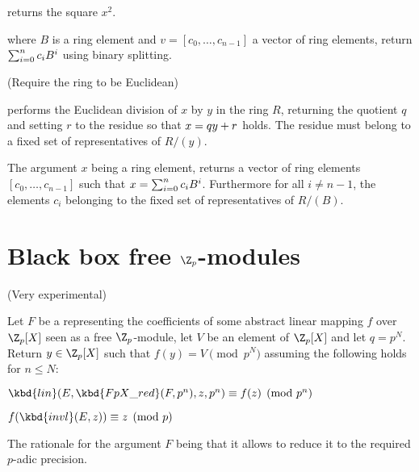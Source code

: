  returns the square $x^2$.

where $B$ is a ring element and $v=[c_0,\ldots,c_{n-1}]$ a vector of ring elements,
return $\sum_{i=0}^n c_i\*B^i$ using binary splitting.


(Require the ring to be Euclidean)

 performs the Euclidean division of $x$ by $y$ in the ring
$R$, returning the quotient $q$ and setting $r$ to the residue so that
$x=q\*y+r$ holds. The residue must belong to a fixed set of representatives of
$R/(y)$.

The argument $x$ being a ring element,  returns a vector of
ring elements $[c_0,\ldots,c_{n-1}]$ such that $x = \sum_{i=0}^n c_i\*B^i$.
Furthermore for all $i\ne n-1$, the elements $c_i$ belonging to the fixed set
of representatives of $R/(B)$.

\section{Black box free $\Z_p$-modules}

(Very experimental)


Let $F$ be a  representing the coefficients of some abstract
linear mapping $f$ over $\Z_p[X]$ seen as a free $\Z_p$-module, let $V$ be
an element of $\Z_p[X]$ and let $q = p^N$.  Return $y\in\Z_p[X]$ such that
$f(y)=V\pmod{p^N}$ assuming the following holds for $n\leq N$:

\item $\kbd{lin}(E, \kbd{FpX\_red}(F, p^n), z, p^n) \equiv f(z) \pmod{p^n}$

\item $f(\kbd{invl}(E, z)) \equiv z \pmod{p}$

The rationale for the argument $F$ being that it allows 
to reduce it to the required $p$-adic precision.



